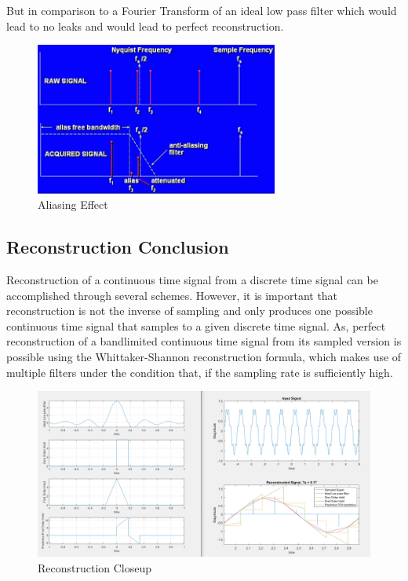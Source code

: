 \documentclass{article}
\begin{document}
But in comparison to a Fourier Transform of an ideal low pass filter which would lead to no leaks and would lead to perfect reconstruction. 

\begin{figure}[htbp]
    \begin{center}
	\includegraphics[width=80mm]{figures/anti_aliasing.png}
    \end{center}
    \caption{Aliasing Effect}
\end{figure}


\subsection{Reconstruction Conclusion}
Reconstruction \cite{b2} of a continuous time signal from a discrete time signal can be accomplished through several schemes. However, it is important that reconstruction is not the inverse of sampling and only produces one possible continuous time signal that samples to a given discrete time signal. As, perfect reconstruction of a bandlimited continuous time signal from its sampled version is possible using the Whittaker-Shannon reconstruction formula, which makes use of multiple filters under the condition that, if the sampling rate is sufficiently high.

\begin{figure}[htbp]
    \begin{center}
	\includegraphics[width=150mm]{figures/Result.PNG}
    \end{center}
    \caption{Reconstruction Closeup}
\end{figure}
\end{document}
